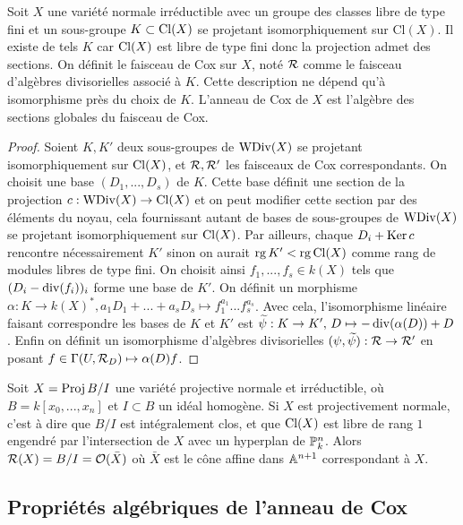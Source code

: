 \begin{cons}\label{consFreeCoxRing}
Soit $X$ une variété normale irréductible avec un groupe des classes libre de type fini et un sous-groupe $K\subset \operatorname{Cl}(X)$ se projetant isomorphiquement sur Cl$(X)$. Il existe de tels $K$ car $\operatorname{Cl}(X)$ est libre de type fini donc la projection admet des sections. On définit le faisceau de Cox sur $X$, noté $\mathcal{R}$ comme le faisceau d'algèbres divisorielles associé à $K$. Cette description ne dépend qu'à isomorphisme près du choix de $K$. L'anneau de Cox de $X$ est l'algèbre des sections globales du faisceau de Cox. 
\end{cons}
\begin{proof}
Soient $K,K'$ deux sous-groupes de $\operatorname{WDiv}(X)$ se projetant isomorphiquement sur $\operatorname{Cl}(X)$, et $\mathcal{R},\mathcal{R}'$ les faisceaux de Cox correspondants. On choisit une base $(D_1,...,D_s)$ de $K$. Cette base définit une section de la projection $c:\operatorname{WDiv}(X)\rightarrow \operatorname{Cl}(X)$ et on peut modifier cette section par des éléments du noyau, cela fournissant autant de bases de sous-groupes de $\operatorname{WDiv}(X)$ se projetant isomorphiquement sur $\operatorname{Cl}(X)$. Par ailleurs, chaque $D_i+\operatorname{Ker} c$ rencontre nécessairement $K'$ sinon on aurait $\operatorname{rg} K' < \operatorname{rg} \operatorname{Cl}(X)$ comme rang de modules libres de type fini. On choisit ainsi $f_1,...,f_s\in k(X)$ tels que $(D_i-\operatorname{div}(f_i))_i$ forme une base de $K'$. On définit un morphisme $\alpha:K\rightarrow k(X)^*, a_1D_1+...+a_sD_s\mapsto f_1^{a_1}...f_s^{a_s}$. Avec cela, l'isomorphisme linéaire faisant correspondre les bases de $K$ et $K'$ est $\widetilde{\psi}:K\rightarrow K',\, D\mapsto -\operatorname{div}(\alpha(D))+D$. Enfin on définit un isomorphisme d'algèbres divisorielles $(\psi, \widetilde{\psi}): \mathcal{R}\rightarrow\mathcal{R}'$ en posant $f\in \Gamma(U, \mathcal{R}_D)\mapsto \alpha(D)f$.
\end{proof}

\begin{ex}
Soit $X=\operatorname{Proj} B/I$ une variété projective normale et irréductible, où $B=k[x_0,...,x_n]$ et $I\subset B$ un idéal homogène. Si $X$ est projectivement normale, c'est à dire que $B/I$ est intégralement clos, et que $\operatorname{Cl}(X)$ est libre de rang $1$ engendré par l'intersection de $X$ avec un hyperplan de $\mathbb{P}^n_k$. Alors $\mathcal{R}(X)=B/I=\mathcal{O}(\bar{X})$ où $\bar{X}$ est le cône affine dans $\mathbb{A}^{n+1}$ correspondant à $X$.
\end{ex}

\subsection{Propriétés algébriques de l'anneau de Cox}

